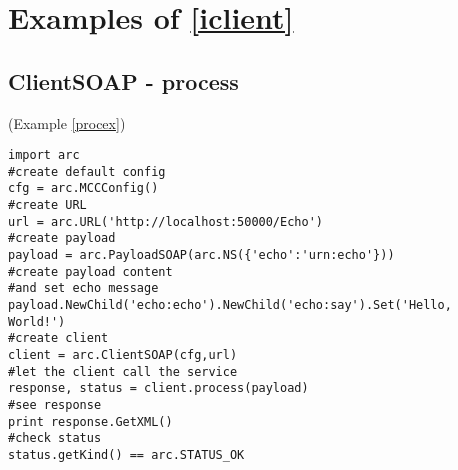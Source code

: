 \section{Examples of \ref{iclient}}
\subsection{ClientSOAP - process}
(Example \ref{procex})
\label{cprocex}
\begin{verbatim}
import arc
#create default config
cfg = arc.MCCConfig()
#create URL
url = arc.URL('http://localhost:50000/Echo')
#create payload
payload = arc.PayloadSOAP(arc.NS({'echo':'urn:echo'}))
#create payload content
#and set echo message
payload.NewChild('echo:echo').NewChild('echo:say').Set('Hello, World!')
#create client
client = arc.ClientSOAP(cfg,url)
#let the client call the service
response, status = client.process(payload)
#see response
print response.GetXML()
#check status
status.getKind() == arc.STATUS_OK
\end{verbatim}

